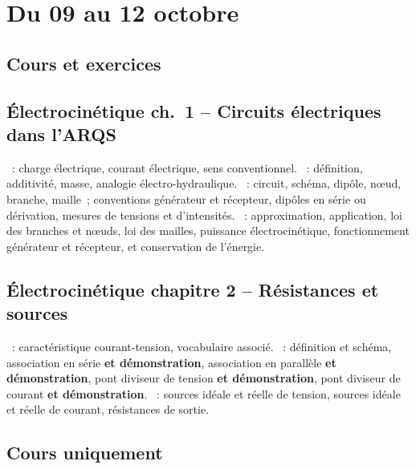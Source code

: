 \documentclass[a4paper, 12pt, final, garamond]{book}
\begin{document}
\setcounter{chapter}{3}

\chapter{Du 09 au 12 octobre}

\section{Cours et exercices}

\section*{Électrocinétique ch.\ 1 -- Circuits électriques dans l'ARQS}
\begin{enumerate}[label=\Roman*]
	~: charge électrique, courant
	électrique, sens conventionnel.
	~: définition, additivité, masse,
	analogie électro-hydraulique.
	~: circuit, schéma,
	dipôle, nœud, branche, maille~; conventions générateur et récepteur,
	dipôles en série ou dérivation, mesures de tensions et d'intensités.
	~:
	approximation, application, loi des branches et nœuds, loi des mailles,
	puissance électrocinétique, fonctionnement générateur et récepteur, et
	conservation de l'énergie.
\end{enumerate}

\section*{Électrocinétique chapitre 2 -- Résistances et sources}
\begin{enumerate}[label=\Roman*]
	~: caractéristique courant-tension,
	vocabulaire associé.
	~: définition et schéma, association en série
	\textbf{et démonstration}, association en parallèle \textbf{et
		démonstration}, pont diviseur de tension \textbf{et démonstration}, pont
	diviseur de courant \textbf{et démonstration}.
	~: sources idéale et réelle de tension, sources idéale
	et réelle de courant, résistances de sortie.
\end{enumerate}

\section{Cours uniquement}
\end{document}
